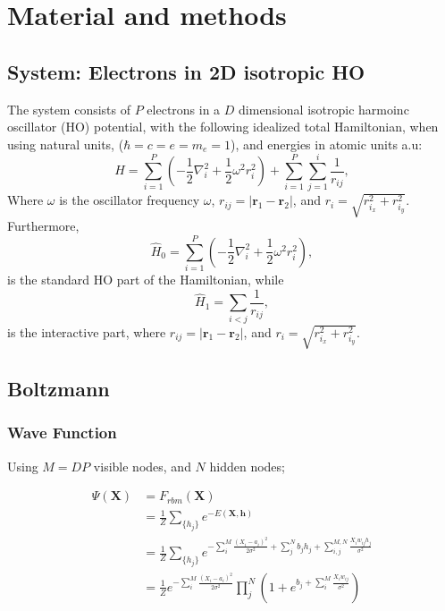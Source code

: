 \documentclass[%
oneside,                 %
final,                   %
10pt]{article}
\begin{document}
\section{Material and methods} \label{theory}


\subsection{System: Electrons in 2D isotropic HO}
The system consists of $P$ electrons in a $D$ dimensional isotropic harmoinc oscillator (HO) potential, with the following idealized total Hamiltonian, when using natural units, ($\hbar=c=e=m_e=1$), and energies in  atomic units a.u:
\begin{equation}
\label{eq:finalH}
H=\sum_{i=1}^{P} \left(  -\frac{1}{2} \nabla_i^2 + \frac{1}{2} \omega^2r_i^2  \right)+\sum_{i=1}^P \sum_{j=1}^i \frac{1}{r_{ij}},
\end{equation}
Where $\omega$ is the oscillator frequency  $\omega$, $r_{ij}=\vert \bm{r}_1-\bm{r}_2\vert$, and $r_i = \sqrt{r_{i_x}^2+r_{i_y}^2}$.  Furthermore,
\begin{equation*}
\hat{H}_0=\sum_{i=1}^{P} \left(  -\frac{1}{2} \nabla_i^2 + \frac{1}{2} \omega^2r_i^2  \right),
\end{equation*}
is the standard HO part of the Hamiltonian, while
\begin{equation*}
\hat{H}_1=\sum_{i<j}\frac{1}{r_{ij}},
\end{equation*}
is the interactive part, where $r_{ij}=\vert \bm{r}_1-\bm{r}_2\vert$, and $r_i = \sqrt{r_{i_x}^2+r_{i_y}^2}$.

\subsection{Boltzmann}

\subsubsection{Wave Function}
Using $M=DP$ visible nodes, and $N$ hidden nodes;

\begin{align*}
\Psi (\mathbf{X}) &= F_{rbm}(\mathbf{X}) \\
&= \frac{1}{Z}\sum_{\{h_j\}} e^{-E(\mathbf{X}, \mathbf{h})} \\
&= \frac{1}{Z} \sum_{\{h_j\}} e^{-\sum_i^M \frac{(X_i - a_i)^2}{2\sigma^2} + \sum_j^N b_j h_j + \sum_{i,j}^{M,N} \frac{X_i w_{ij} h_j}{\sigma^2}} \\
&= \frac{1}{Z} e^{-\sum_i^M \frac{(X_i - a_i)^2}{2\sigma^2}} \prod_j^N (1 + e^{b_j + \sum_i^M \frac{X_i w_{ij}}{\sigma^2}}) \\
\end{align*}
\end{document}
